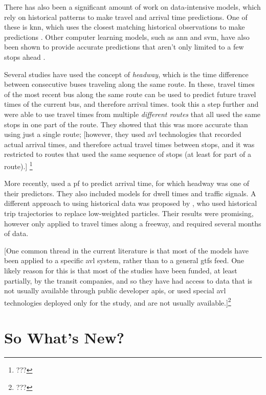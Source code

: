 \documentclass[12pt,a4paper]{article}
\begin{document}
There has also been a significant amount of work on data-intensive models,
which rely on historical patterns to make travel and arrival time predictions.
One of these is \gls{knn}, which uses the closest matching historical observations
to make predictions \citep{cn}.
Other computer learning models, such as \gls{ann} and \gls{svm}, have also been shown to
provide accurate predictions that aren't only limited to a few stops ahead
\citep{cn}.


Several studies have used the concept of \emph{headway},
which is the time difference between consecutive buses traveling along the same route.
In these, travel times of the most recent bus along the same route can be used
to predict future travel times of the current bus, and therefore arrival times.
\cite{yu-etal:2011} took this a step further and were able to use travel times
from multiple \emph{different routes} that all used the same stops in one part of the route.
They showed that this was more accurate than using just a single route;
[however, they used \gls{avl} technologies that recorded actual arrival times,
and therefore actual travel times between stops,
and it was restricted to routes that used the same sequence of stops 
(at least for part of a route).]
\footnote{???}


More recently, \cite{hans-etal:2015} used a \gls{pf} to predict arrival time, 
for which headway was one of their predictors.
They also included models for dwell times and traffic signals.
A different approach to using historical data was proposed by \cite{chen-rakha:2014}, 
who used historical trip trajectories to replace low-weighted particles.
Their results were promising, however only applied to travel times along a freeway,
and required several months of data.


[One common thread in the current literature is that most of the models have been applied to a
specific \gls{avl} system, rather than to a general \gls{gtfs} feed.
One likely reason for this is that most of the studies have been funded,
at least partially, by the transit companies, and so they have had access to data
that is not usually available through public developer \glspl{api},
or used special \gls{avl} technologies deployed only for the study,
and are not usually available.]\footnote{???}





\section{So What's New?}
\label{sec:whatsnew}
\end{document}
